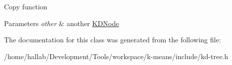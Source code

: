 Copy function 
\begin{DoxyParams}{Parameters}
{\em other} & another \hyperlink{classSimpleCluster_1_1KDNode}{K\-D\-Node} \\
\hline
\end{DoxyParams}


The documentation for this class was generated from the following file\-:\begin{DoxyCompactItemize}
\item 
/home/hallab/\-Development/\-Tools/workspace/k-\/means/include/kd-\/tree.\-h\end{DoxyCompactItemize}
